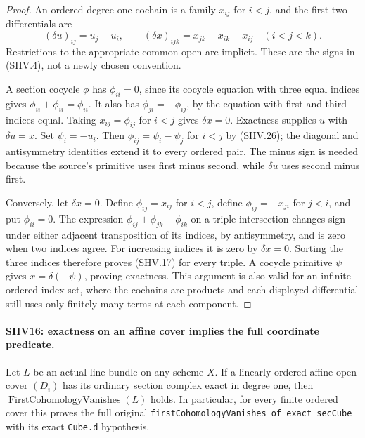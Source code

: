 \documentclass[11pt,a4paper]{article}
\numberwithin{equation}{section}
\theoremstyle{remark}\newtheorem{remark}[theorem]{Remark}
\begin{document}
\begin{proof}
An ordered degree-one cochain is a family $x_{ij}$ for $i<j$,
and the first two differentials are
\[
 (\delta u)_{ij}=u_j-u_i,\qquad
 (\delta x)_{ijk}=x_{jk}-x_{ik}+x_{ij}\quad(i<j<k).
                                                        \tag{SHV.26}
\]
Restrictions to the appropriate common open are implicit.
These are the signs in (SHV.4), not a newly chosen convention.

A section cocycle $\phi$ has $\phi_{ii}=0$, since its
cocycle equation with three equal indices gives
$\phi_{ii}+\phi_{ii}=\phi_{ii}$.  It also has
$\phi_{ji}=-\phi_{ij}$, by the equation with first and third
indices equal.  Taking $x_{ij}=\phi_{ij}$ for $i<j$ gives
$\delta x=0$.  Exactness supplies $u$ with $\delta u=x$.
Set $\psi_i=-u_i$.  Then
$\phi_{ij}=\psi_i-\psi_j$ for $i<j$ by (SHV.26);
the diagonal and antisymmetry identities extend it to every
ordered pair.  The minus sign is needed because the source's
primitive uses first minus second, while $\delta u$ uses
second minus first.

Conversely, let $\delta x=0$.  Define $\phi_{ij}=x_{ij}$
for $i<j$, define $\phi_{ij}=-x_{ji}$ for $j<i$, and put
$\phi_{ii}=0$.  The expression
$\phi_{ij}+\phi_{jk}-\phi_{ik}$ on a triple intersection
changes sign under either adjacent transposition of its
indices, by antisymmetry, and is zero when two indices agree.
For increasing indices it is zero by $\delta x=0$.
Sorting the three indices therefore proves (SHV.17) for
every triple.  A cocycle primitive $\psi$ gives
$x=\delta(-\psi)$, proving exactness.  This argument is also
valid for an infinite ordered index set, where the cochains
are products and each displayed differential still uses only
finitely many terms at each component.
\end{proof}

\paragraph{SHV16: exactness on an affine cover implies the full coordinate predicate.}
\label{claim:SHV16}
Let $L$ be an actual line bundle on any scheme $X$.
If a linearly ordered affine open cover $(D_i)$ has its
ordinary section complex exact in degree one, then
$\operatorname{FirstCohomologyVanishes}(L)$ holds.
In particular, for every finite ordered cover this proves
the full original
\texttt{first\allowbreak Cohomology\allowbreak Vanishes\_\allowbreak of\_\allowbreak exact\_\allowbreak sec\allowbreak Cube}
with its exact \texttt{Cube.\allowbreak d} hypothesis.
\end{document}
